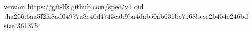 version https://git-lfs.github.com/spec/v1
oid sha256:6aa5f2fa8ad04977a8e40d4743eab9ba4dab50ab031be7168bcce2b454e246bd
size 361375
